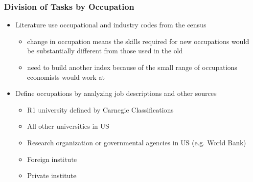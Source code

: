 \documentclass[10pt,svgnames,fragile]{beamer}
\begin{document}
\begin{frame}[label = job_des]
	\frametitle{Division of Tasks by Occupation}
	\begin{itemize}
		\item Literature use occupational and industry codes from the census
		\begin{itemize}
			\vspace{1.5 mm}
			\item change in occupation means the skills required for new occupations would be substantially different from those used in the old 
			\vspace{1.5 mm}
			\item need to build another index because of the small range of occupations economists would work at
		\end{itemize}
\vfill
		\item Define occupations  by analyzing job descriptions and other sources
		\begin{itemize}
		\vspace{1.5 mm}
			\item R1 university defined by {\small Carnegie Classifications}
			\vspace{1.5 mm}
			\item All other universities in US
			\vspace{1.5 mm}
			\item Research organization or governmental agencies in US (e.g. World Bank)
			\vspace{1.5 mm}
			\item Foreign institute
			\vspace{1.5 mm}
			\item Private institute\\
			\vspace{1.5 mm}
			\hyperlink{NLP}{}
		\end{itemize}
\vfill
	\end{itemize}
\end{frame}
\end{document}
